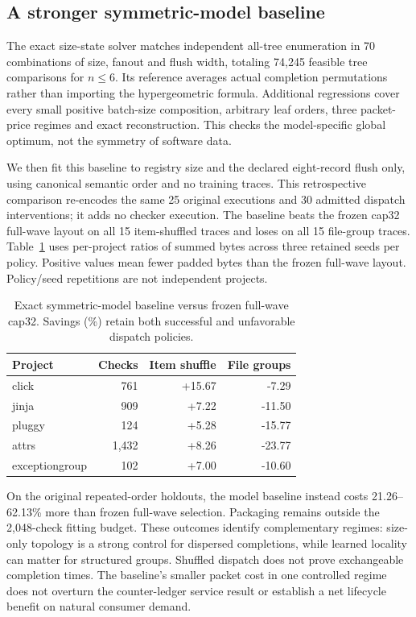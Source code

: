 \subsection{A stronger symmetric-model baseline}
The exact size-state solver matches independent all-tree enumeration in
70 combinations of size, fanout and flush width, totaling 74,245 feasible
tree comparisons for $n\le6$. Its reference averages actual completion
permutations rather than importing the hypergeometric formula. Additional
regressions cover every small positive batch-size composition, arbitrary
leaf orders, three packet-price regimes and exact reconstruction. This
checks the model-specific global optimum, not the symmetry of software data.

We then fit this baseline to registry size and the declared eight-record
flush only, using canonical semantic order and no training traces.
This retrospective comparison re-encodes the same 25 original executions
and 30 admitted dispatch interventions; it adds no checker execution.
The baseline beats the frozen cap32 full-wave layout on all 15 item-shuffled
traces and loses on all 15 file-group traces. Table~\ref{tab:v14-symmetry}
uses per-project ratios of summed bytes across three retained seeds per
policy. Positive values mean fewer padded bytes than the frozen full-wave
layout. Policy/seed repetitions are not independent projects.

\begin{table}[t]\centering\small
\caption{Exact symmetric-model baseline versus frozen full-wave cap32.
Savings (\%) retain both successful and unfavorable dispatch policies.}
\label{tab:v14-symmetry}
\begin{tabular}{@{}lrrr@{}}\toprule
Project & Checks & Item shuffle & File groups\\\midrule
click & 761 & +15.67 & -7.29\\
jinja & 909 & +7.22 & -11.50\\
pluggy & 124 & +5.28 & -15.77\\
attrs & 1,432 & +8.26 & -23.77\\
exceptiongroup & 102 & +7.00 & -10.60\\
\bottomrule\end{tabular}
\end{table}

On the original repeated-order holdouts, the model baseline instead costs
21.26--62.13\% more than frozen full-wave selection. Packaging remains
outside the 2,048-check fitting budget. These outcomes identify complementary
regimes: size-only topology is a strong control for dispersed completions,
while learned locality can matter for structured groups. Shuffled dispatch
does not prove exchangeable completion times. The baseline's smaller packet
cost in one controlled regime does not overturn the counter-ledger service
result or establish a net lifecycle benefit on natural consumer demand.
